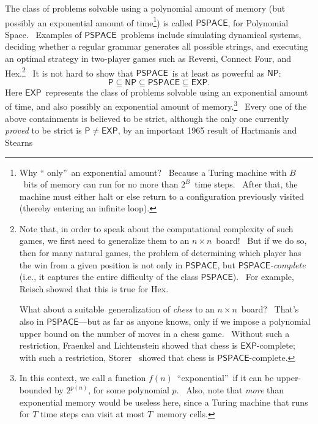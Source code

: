 \documentclass[12pt,onecolumn]{article}%
\begin{document}
The class of problems solvable using a polynomial amount of memory (but
possibly an exponential amount of time\footnote{Why \textquotedblleft
only\textquotedblright\ an exponential amount? \ Because a Turing machine with
$B$\ bits of memory can run for no more than $2^{B}$\ time steps. \ After
that, the machine must either halt or else return to a configuration
previously visited (thereby entering an infinite loop).}) is called
$\mathsf{PSPACE}$, for Polynomial Space. \ Examples of $\mathsf{PSPACE}%
$\ problems include simulating dynamical systems, deciding whether a regular
grammar generates all possible strings, and executing an optimal strategy in
two-player games such as Reversi, Connect Four, and
Hex.\footnote{\label{chessnote}Note that, in order to speak about the
computational complexity of such games, we first need to generalize them to an
$n\times n$\ board! \ But if we do so, then for many natural games, the
problem of determining which player has the win from a given position is not
only in $\mathsf{PSPACE}$, but $\mathsf{PSPACE}$\textit{-complete} (i.e., it
captures the entire difficulty of the class $\mathsf{PSPACE}$). \ For example,
Reisch \cite{reisch} showed that this is true for Hex.
\par
What about a suitable\ generalization of \textit{chess} to an $n\times
n$\ board? \ That's also in $\mathsf{PSPACE}$---but as far as anyone knows,
only if we impose a polynomial upper bound on the number of moves in a chess
game. \ Without such a restriction, Fraenkel and Lichtenstein \cite{fraenkel}
showed that chess is $\mathsf{EXP}$-complete; with such a restriction, Storer
\cite{storer}\ showed that chess is $\mathsf{PSPACE}$-complete.} \ It is not
hard to show that $\mathsf{PSPACE}$\ is at least as powerful as $\mathsf{NP}$:%
\[
\mathsf{P}\subseteq\mathsf{NP}\subseteq\mathsf{PSPACE}\subseteq\mathsf{EXP}.
\]
Here $\mathsf{EXP}$\ represents the class of problems solvable using an
exponential amount of time, and also possibly an exponential amount of
memory.\footnote{In this context, we call a function $f\left(  n\right)
$\ \textquotedblleft exponential\textquotedblright\ if it can be upper-bounded
by $2^{p\left(  n\right)  }$, for some polynomial $p$. \ Also, note that
\textit{more} than exponential memory would be useless here, since a Turing
machine that runs for $T$ time steps can visit at most $T$\ memory cells.}
\ Every one of the above containments is believed to be strict, although the
only one currently \textit{proved} to be strict is $\mathsf{P}\neq
\mathsf{EXP}$, by an important 1965 result of Hartmanis and Stearns
\end{document}
